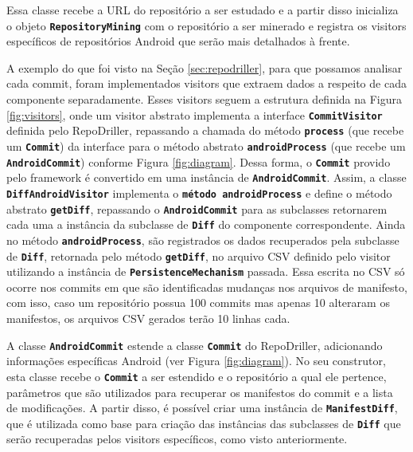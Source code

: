 \documentclass[a4paper,12pt]{article}
\begin{document}
{Essa classe recebe a URL do repositório a ser estudado e a partir disso inicializa o objeto {\small\texttt{\textbf{RepositoryMining}}} com o repositório a ser minerado e registra os visitors específicos de repositórios Android que serão mais detalhados à frente.


A exemplo do que foi visto na Seção \ref{sec:repodriller}, para que possamos analisar cada commit, foram implementados visitors que extraem dados a respeito de cada componente separadamente. Esses visitors seguem a estrutura definida na Figura \ref{fig:visitors}, onde um visitor abstrato implementa a interface {\small\texttt{\textbf{CommitVisitor}}} definida pelo RepoDriller, repassando a chamada do método {\small\texttt{\textbf{process}}} (que recebe um {\small\texttt{\textbf{Commit}}}) da interface para o método abstrato {\small\texttt{\textbf{androidProcess}}} (que recebe um {\small\texttt{\textbf{AndroidCommit}}}) conforme Figura \ref{fig:diagram}. Dessa forma, o {\small\texttt{\textbf{Commit}}} provido pelo framework é convertido em uma instância de {\small\texttt{\textbf{AndroidCommit}}}. Assim, a classe {\small\texttt{\textbf{DiffAndroidVisitor}}} implementa o {\small\texttt{\textbf{método androidProcess}}} e define o método abstrato {\small\texttt{\textbf{getDiff}}}, repassando o {\small\texttt{\textbf{AndroidCommit}}} para as subclasses retornarem cada uma a instância da subclasse de {\small\texttt{\textbf{Diff}}} do componente correspondente. Ainda no método {\small\texttt{\textbf{androidProcess}}}, são registrados os dados recuperados pela subclasse de {\small\texttt{\textbf{Diff}}}, retornada pelo método {\small\texttt{\textbf{getDiff}}}, no arquivo CSV definido pelo visitor utilizando a instância de {\small\texttt{\textbf{PersistenceMechanism}}} passada. Essa escrita no CSV só ocorre nos commits em que são identificadas mudanças nos arquivos de manifesto, com isso, caso um repositório possua 100 commits mas apenas 10  alteraram os manifestos, os arquivos CSV gerados terão 10 linhas cada.

A classe {\small\texttt{\textbf{AndroidCommit}}} estende a classe {\small\texttt{\textbf{Commit}}} do RepoDriller, adicionando informações específicas Android (ver Figura \ref{fig:diagram}). No seu construtor, esta classe recebe o {\small\texttt{\textbf{Commit}}} a ser estendido e o repositório a qual ele pertence, parâmetros que são utilizados para recuperar os manifestos do commit e a lista de modificações. A partir disso, é possível criar uma instância de {\small\texttt{\textbf{ManifestDiff}}}, que é utilizada como base para criação das instâncias das subclasses de {\small\texttt{\textbf{Diff}}} que serão recuperadas pelos visitors específicos, como visto anteriormente.


}
\end{document}
